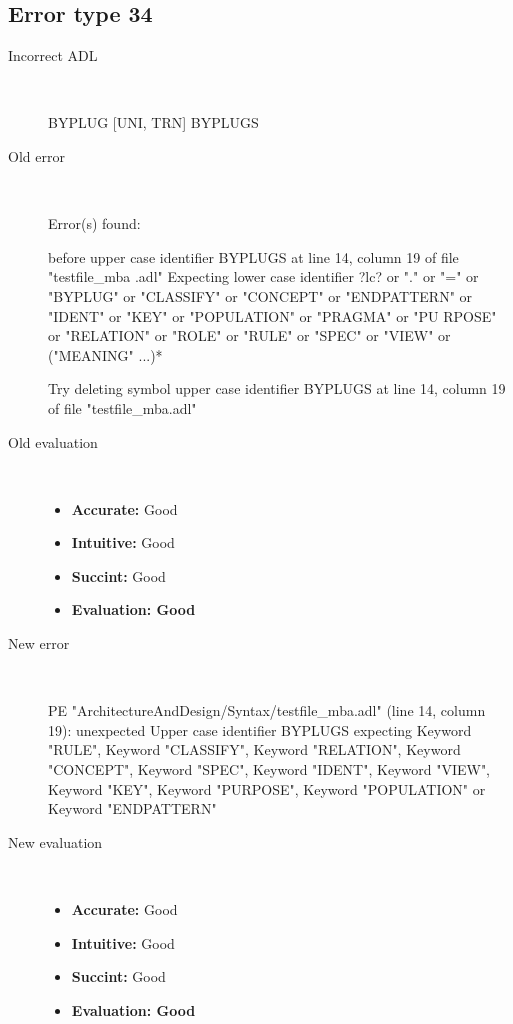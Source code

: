 \hrulefill

\subsection{Error type 34}
  \begin{description}
  \item[Incorrect ADL]~\\
\begin{adl}
BYPLUG [UNI, TRN] BYPLUGS\end{adl}
  \item[Old error]~\\
\begin{haskell}
Error(s) found:

before upper case identifier BYPLUGS at line 14, column 19 of file "testfile_mba
.adl"
Expecting lower case identifier ?lc? or "." or "=" or "BYPLUG" or "CLASSIFY" or
"CONCEPT" or "ENDPATTERN" or "IDENT" or "KEY" or "POPULATION" or "PRAGMA" or "PU
RPOSE" or "RELATION" or "ROLE" or "RULE" or "SPEC" or "VIEW" or ("MEANING" ...)*

Try deleting symbol upper case identifier BYPLUGS at line 14, column 19 of file
"testfile_mba.adl"\end{haskell}
  \item[Old evaluation]~\\
    \begin{itemize}
    \item \textbf{Accurate:} Good
    \item \textbf{Intuitive:} Good
    \item \textbf{Succint:} Good
    \item \textbf{Evaluation: Good}
    \end{itemize}
  \item[New error]~\\
\begin{haskell}
PE "ArchitectureAndDesign/Syntax/testfile_mba.adl" (line 14, column 19):
unexpected Upper case identifier BYPLUGS
expecting Keyword "RULE", Keyword "CLASSIFY", Keyword "RELATION", Keyword "CONCEPT", Keyword "SPEC", Keyword "IDENT", Keyword "VIEW", Keyword "KEY", Keyword "PURPOSE", Keyword "POPULATION" or Keyword "ENDPATTERN"\end{haskell}
  \item[New evaluation]~\\
    \begin{itemize}
    \item \textbf{Accurate:} Good
    \item \textbf{Intuitive:} Good
    \item \textbf{Succint:} Good
    \item \textbf{Evaluation: Good
}
    \end{itemize}
  \end{description}

